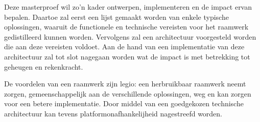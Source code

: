 Deze masterproef wil zo'n kader ontwerpen, implementeren en de impact ervan
bepalen. Daartoe zal eerst een lijst gemaakt worden van enkele typische
oplossingen, waaruit de functionele en technische vereisten voor het raamwerk
gedistilleerd kunnen worden. Vervolgens zal een architectuur voorgesteld worden
die aan deze vereisten voldoet. Aan de hand van een implementatie van deze
architectuur zal tot slot nagegaan worden wat de impact is met betrekking tot
geheugen en rekenkracht.

De voordelen van een raamwerk zijn legio: een herbruikbaar raamwerk neemt
zorgen, gemeenschappelijk aan de verschillende oplossingen, weg en kan zorgen
voor een betere implementatie. Door middel van een goedgekozen technische
architectuur kan tevens platformonafhankelijheid nagestreefd worden.
